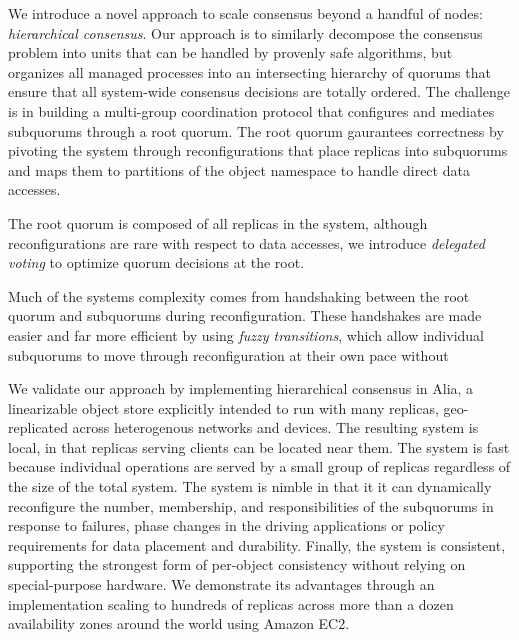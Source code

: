 \documentclass[11pt,conference]{IEEEtran}
\newcommand{\hc}{hierarchical consensus\xspace}
\newcommand{\subs}{subquorums\xspace}
\newcommand{\roo}{root quorum\xspace}
\begin{document}
We introduce a novel approach to scale consensus beyond a handful of nodes:
\emph{\hc}.
Our approach is to similarly decompose the consensus problem into units that can be
handled by provenly safe algorithms, but organizes all managed processes into an
intersecting hierarchy of quorums that ensure that all system-wide consensus decisions
are totally ordered.
The challenge is in building a multi-group coordination protocol that configures and
mediates \subs through a \roo.
The \roo gaurantees correctness by pivoting the system through reconfigurations that
place replicas into \subs and maps them to partitions of the object namespace to handle
direct data accesses.




The \roo is composed of all replicas in the system, although reconfigurations are rare
with respect to data accesses, we introduce \emph{delegated voting} to optimize quorum
decisions at the root.

Much of the systems complexity comes from handshaking between the \roo and \subs during
reconfiguration.
These handshakes are made easier and far more efficient by using \emph{fuzzy transitions},
which allow individual \subs to move through reconfiguration at their own pace without

We validate our approach by implementing \hc in Alia, a linearizable object store
explicitly intended to run with many replicas, geo-replicated across heterogenous
networks and devices.
The resulting system is local, in that replicas serving clients can be located near them.
The system is fast because individual operations are served by a small group of replicas
regardless of the size of the total system.
The system is nimble in that it it can dynamically reconfigure the number, membership,
and responsibilities of the subquorums in response to failures, phase changes in the
driving applications or policy requirements for data placement and durability.
Finally, the system is consistent, supporting the strongest form of per-object
consistency without relying on special-purpose hardware.
We demonstrate its advantages through an implementation scaling to hundreds of replicas
across more than a dozen availability zones around the world using Amazon EC2.
\end{document}
